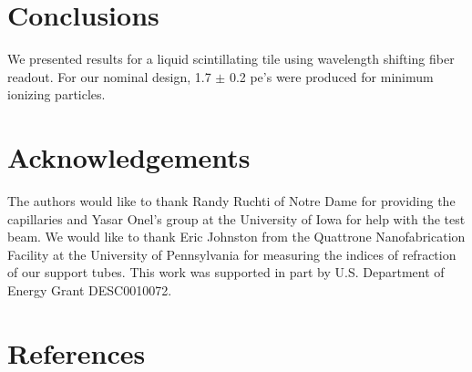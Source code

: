 \documentclass[review]{elsarticle}
\begin{document}
\section{Conclusions}

We presented results for a liquid scintillating tile using wavelength
shifting fiber readout.  For our nominal design, 1.7 ${\pm}$ 0.2 pe's
were produced for minimum ionizing particles.

\section{Acknowledgements}
The authors would like to thank Randy Ruchti of Notre Dame for
providing the capillaries and Yasar Onel's group at the University of
Iowa for help with the test beam.  We would like to thank Eric
Johnston from the Quattrone Nanofabrication Facility at the University
of Pennsylvania for measuring the indices of refraction of our support
tubes.  This work was supported in part by U.S. Department of Energy
Grant DESC0010072.

\section*{References}


\end{document}
